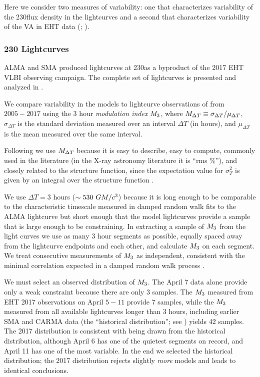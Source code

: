 Here we consider two measures of variability: one that characterizes variability of the 230\GHz flux density in the lightcurves \citep{Wielgus2022} and a second that characterizes variability of the VA in EHT data (; \citealt{NoiseModeling}).


\subsubsection{230 \GHz Lightcurves}

ALMA and SMA produced \sgra lightcurves at 230\GHz as a byproduct of the 2017 EHT VLBI observing campaign. The complete set of lightcurves is presented and analyzed in \cite{Wielgus2022}.

We compare variability in the models to lightcurve observations of \sgra from $2005-2017$ using the 3 hour {\em modulation index} $M_{3}$, where $M_{\Delta T} \equiv \sigma_{\Delta T}/\mu_{\Delta T}$, $\sigma_{\Delta T}$ is the standard deviation measured over an interval $\Delta T$ (in hours), and $\mu_{\Delta T}$ is the mean measured over the same interval.

Following \citet{2015ApJ...812..103C} we use $M_{\Delta T}$ because it is easy to describe, easy to compute, commonly used in the literature (in the X-ray astronomy literature it is ``rms \%''), and closely related to the structure function, since the expectation value for $\sigma_T^2$ is given by an integral over the structure function \citep[see][]{Lee_2022}.

We use $\Delta T = 3$ hours ($\sim 530~GM/c^3$) because it is long enough to be comparable to the characteristic timescale measured in damped random walk fits to the ALMA lightcurve \citep[see Table 10 of][]{Wielgus2022} but short enough that the model lightcurves provide a sample that is large enough to be constraining.  In extracting a sample of $M_{3}$ from the light curves we use as many 3 hour segments as possible, equally spaced away from the lightcurve endpoints and each other, and calculate $M_{3}$ on each segment.  We treat consecutive measurements of $M_{3}$ as independent, consistent with the minimal correlation expected in a damped random walk process \citep{Lee_2022}.

We must select an observed distribution of $M_{3}$.  The April 7 data alone provide only a weak constraint because there are only 3 samples.  The $M_{3}$ measured from EHT 2017 observations on April $5-11$ provide 7 samples, while the $M_{3}$ measured from all available lightcurves longer than 3 hours, including earlier SMA and CARMA data (the ``historical distribution''; see \citealt{Wielgus2022}) yields 42 samples.  The 2017 distribution is consistent with being drawn from the historical distribution, although April 6 has one of the quietest segments on record, and April 11 has one of the most variable.  In the end we selected the historical distribution; the 2017 distribution rejects slightly {\em more} models and leads to identical conclusions.

